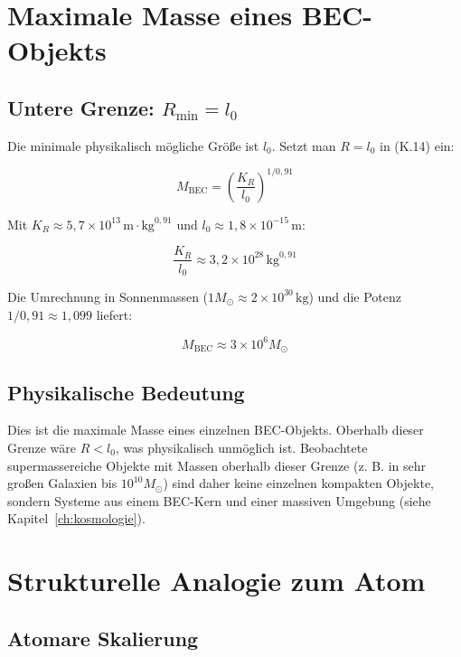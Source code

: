 \section{Maximale Masse eines BEC-Objekts}
\label{app:bec_max_masse}

\subsection{Untere Grenze: \( R_{\min} = l_0 \)}
\label{sub:bec_min_radius}

Die minimale physikalisch mögliche Größe ist \( l_0 \). 
Setzt man \( R = l_0 \) in (K.14) ein:

\[
M_{\text{BEC}} = \left( \frac{K_R}{l_0} \right)^{1/0,91} \tag{K.17}
\]

Mit \( K_R \approx 5,7 \times 10^{13} \, \text{m} \cdot \text{kg}^{0,91} \) 
und \( l_0 \approx 1,8 \times 10^{-15} \, \text{m} \):

\[
\frac{K_R}{l_0} \approx 3,2 \times 10^{28} \, \text{kg}^{0,91}
\]

Die Umrechnung in Sonnenmassen (\( 1 M_{\odot} \approx 2 \times 10^{30} \, \text{kg} \)) 
und die Potenz \( 1/0,91 \approx 1,099 \) liefert:

\[
M_{\text{BEC}} \approx 3 \times 10^6 M_{\odot} \tag{K.18}
\]

\subsection{Physikalische Bedeutung}
\label{sub:bec_max_bedeutung}

Dies ist die maximale Masse eines einzelnen BEC-Objekts. 
Oberhalb dieser Grenze wäre \( R < l_0 \), was physikalisch unmöglich ist. 
Beobachtete supermassereiche Objekte mit Massen oberhalb dieser Grenze 
(z. B. in sehr großen Galaxien bis \( 10^{10} M_{\odot} \)) sind daher 
keine einzelnen kompakten Objekte, sondern Systeme aus einem 
BEC-Kern und einer massiven Umgebung (siehe Kapitel~\ref{ch:kosmologie}).

\section{Strukturelle Analogie zum Atom}
\label{app:bec_atom_analogie}

\subsection{Atomare Skalierung}
\label{sub:bec_atom_tabelle}

